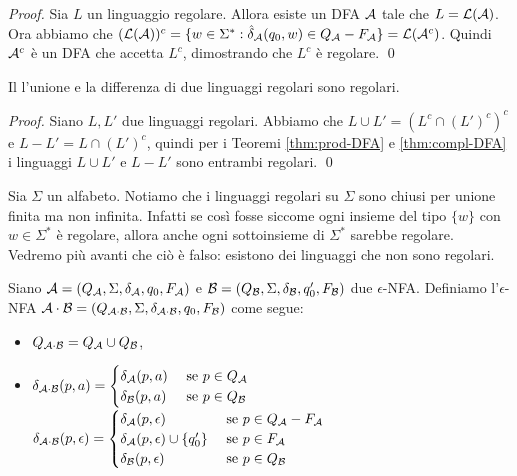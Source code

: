 \documentclass[runningheads,a4paper]{llncs}
\begin{document}
\begin{proof}
Sia $L$ un linguaggio regolare. Allora esiste un DFA $\mathcal{A}$ tale che $L = \mathcal{L}(\mathcal{A})$. Ora abbiamo che $(\mathcal{L}(\mathcal{A}))^c = \{w \in \Sigma^* : \hat{\delta}_{\mathcal{A}}(q_0,w) \in Q_{\mathcal{A}}-F_{\mathcal{A}}\} = \mathcal{L}(\mathcal{A}^c)$. Quindi $\mathcal{A}^c$ \`{e} un DFA che accetta $L^c$, dimostrando che $L^c$ \`{e} regolare.
\qed\end{proof}

\begin{theorem}\label{thm:unione-diff-DFA}
Il l'unione e la differenza di due linguaggi regolari sono regolari.
\end{theorem}

\begin{proof}
Siano $L,L'$ due linguaggi regolari. Abbiamo che $L \cup L' = (L^c \cap (L')^c)^c$ e $L-L' = L \cap (L')^c$, quindi per i Teoremi \ref{thm:prod-DFA} e \ref{thm:compl-DFA} i linguaggi $L \cup L'$ e $L-L'$ sono entrambi regolari.
\qed\end{proof}

\begin{remark}
Sia $\Sigma$ un alfabeto. Notiamo che i linguaggi regolari su $\Sigma$ sono chiusi per unione finita ma non infinita. Infatti se cos\`{i} fosse siccome ogni insieme del tipo $\{w\}$ con $w \in \Sigma^*$ \`{e} regolare, allora anche ogni sottoinsieme di $\Sigma^*$ sarebbe regolare. Vedremo pi\`{u} avanti che ci\`{o} \`{e} falso: esistono dei linguaggi che non sono regolari.
\end{remark}

\begin{definition}\label{def:conc-eNFA}
Siano $\mathcal{A} = (Q_{\mathcal{A}},\Sigma,\delta_{\mathcal{A}},q_0,F_{\mathcal{A}})$ e $\mathcal{B} = (Q_{\mathcal{B}},\Sigma,\delta_{\mathcal{B}},q_0',F_{\mathcal{B}})$ due $\epsilon$-NFA. Definiamo l'$\epsilon$-NFA $\mathcal{A} \cdot \mathcal{B}= (Q_{\mathcal{A} \cdot\mathcal{B}},\Sigma,\delta_{\mathcal{A}\cdot\mathcal{B}},q_0,F_{\mathcal{B}})$ come segue:
\begin{itemize}
\item $Q_{\mathcal{A}\cdot\mathcal{B}} = Q_{\mathcal{A}} \cup Q_{\mathcal{B}}$,
\item $\delta_{\mathcal{A}\cdot\mathcal{B}}(p,a) =
\begin{cases}
\delta_{\mathcal{A}}(p,a) & \mbox{ se } p \in Q_{\mathcal{A}} \\
\delta_{\mathcal{B}}(p,a) & \mbox{ se } p \in Q_{\mathcal{B}} \\
\end{cases}$
\qquad
$\delta_{\mathcal{A}\cdot\mathcal{B}}(p,\epsilon) =
\begin{cases}
\delta_{\mathcal{A}}(p,\epsilon) & \mbox{ se } p \in Q_{\mathcal{A}} - F_{\mathcal{A}} \\
\delta_{\mathcal{A}}(p,\epsilon) \cup \{q_0'\} & \mbox{ se } p \in F_{\mathcal{A}} \\
\delta_{\mathcal{B}}(p,\epsilon) & \mbox{ se } p \in Q_{\mathcal{B}} \\
\end{cases}$
\end{itemize}
\end{definition}
\end{document}
